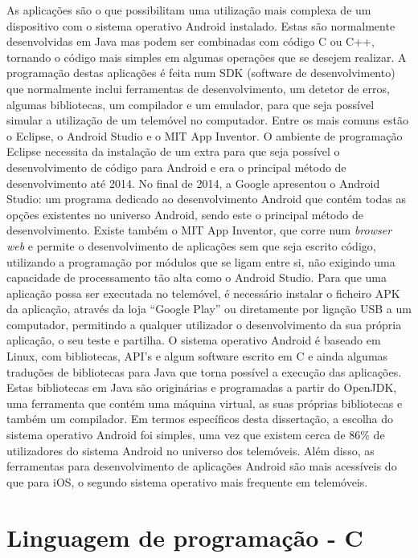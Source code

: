 As aplicações são o que possibilitam uma utilização mais complexa de um dispositivo com o sistema operativo Android instalado.
Estas são normalmente desenvolvidas em Java mas podem ser combinadas com código C ou C++, tornando o código mais simples em algumas operações que se desejem realizar.
A programação destas aplicações é feita num SDK (software de desenvolvimento) que normalmente inclui ferramentas de desenvolvimento, um detetor de erros, algumas bibliotecas, um compilador e um emulador, para que seja possível simular a utilização de um telemóvel no computador.
Entre os mais comuns estão o Eclipse, o Android Studio e o MIT App Inventor.
O ambiente de programação Eclipse necessita da instalação de um extra para que seja possível o desenvolvimento de código para Android e era o principal método de desenvolvimento até 2014.
No final de 2014, a Google apresentou o Android Studio: um programa dedicado ao desenvolvimento Android que contém todas as opções existentes no universo Android, sendo este o principal método de desenvolvimento.
Existe também o MIT App Inventor, que corre num \emph{browser web} e permite o desenvolvimento de aplicações sem que seja escrito código, utilizando a programação por módulos que se ligam entre si, não exigindo uma capacidade de processamento tão alta como o Android Studio.
Para que uma aplicação possa ser executada no telemóvel, é necessário instalar o ficheiro APK da aplicação, através da loja ``Google Play'' ou diretamente por ligação USB a um computador, permitindo a qualquer utilizador o desenvolvimento da sua própria aplicação, o seu teste e partilha.
O sistema operativo Android é baseado em Linux, com bibliotecas, API's e algum software escrito em C e ainda algumas traduções de bibliotecas para Java que torna possível a execução das aplicações.
Estas bibliotecas em Java são originárias e programadas a partir do OpenJDK, uma ferramenta que contém uma máquina virtual, as suas próprias bibliotecas e também um compilador.
Em termos específicos desta dissertação, a escolha do sistema operativo Android foi simples, uma vez que existem cerca de 86\% de utilizadores do sistema Android no universo dos telemóveis.
Além disso, as ferramentas para desenvolvimento de aplicações Android são mais acessíveis do que para iOS, o segundo sistema operativo mais frequente em telemóveis.

\section{Linguagem de programação - C}
\label{sec:C}


